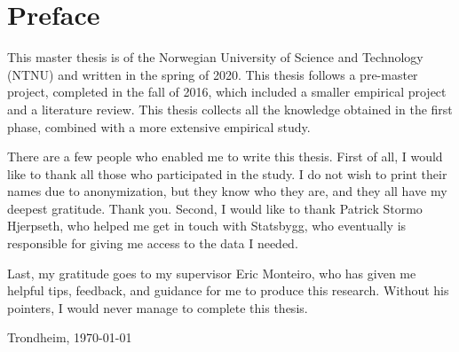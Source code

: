 \section*{\Large Preface}

\noindent This master thesis is of the Norwegian University of Science and Technology (NTNU) and written in the spring of 2020. This thesis follows a pre-master project, completed in the fall of 2016, which included a smaller empirical project and a literature review. This thesis collects all the knowledge obtained in the first phase, combined with a more extensive empirical study. 

There are a few people who enabled me to write this thesis. First of all, I would like to thank all those who participated in the study. I do not wish to print their names due to anonymization, but they know who they are, and they all have my deepest gratitude. Thank you. Second, I would like to thank Patrick Stormo Hjerpseth, who helped me get in touch with Statsbygg, who eventually is responsible for giving me access to the data I needed.

Last, my gratitude goes to my supervisor Eric Monteiro, who has given me helpful tips, feedback, and guidance for me to produce this research. Without his pointers, I would never manage to complete this thesis. 

\vfill

\hfill \thesisAuthor

\hfill Trondheim, \today

\cleardoublepage
